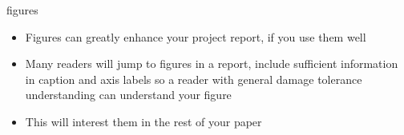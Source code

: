 \documentclass[10pt]{beamer}
\begin{document}
\begin{frame}{figures}
	\begin{itemize}[<+->]
		\item Figures can greatly enhance your project report, if you use them well
		\item Many readers will jump to figures in a report, include sufficient information in caption and axis labels so a reader with general damage tolerance understanding can understand your figure
		\item This will interest them in the rest of your paper
	\end{itemize}
\end{frame}
\end{document}
